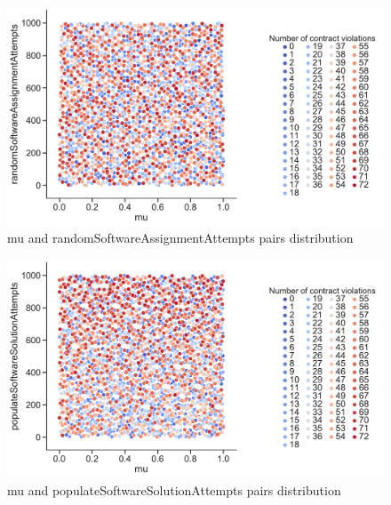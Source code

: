 \begin{figure}
	\centering
	\includegraphics[width=\textwidth]{images/PairsDistr/mu_randomSoftwareAssignmentAttempts.pdf}
	\caption[mu and randomSoftwareAssignmentAttempts pairs distribution]{mu and randomSoftwareAssignmentAttempts pairs distribution}
	\label{fig:mu_randomSoftwareAssignmentAttempts_pair}
\end{figure}
\clearpage
\begin{figure}
	\centering
	\includegraphics[width=\textwidth]{images/PairsDistr/mu_populateSoftwareSolutionAttempts.pdf}
	\caption[mu and populateSoftwareSolutionAttempts pairs distribution]{mu and populateSoftwareSolutionAttempts pairs distribution}
	\label{fig:mu_populateSoftwareSolutionAttempts_pair}
\end{figure}
\clearpage
